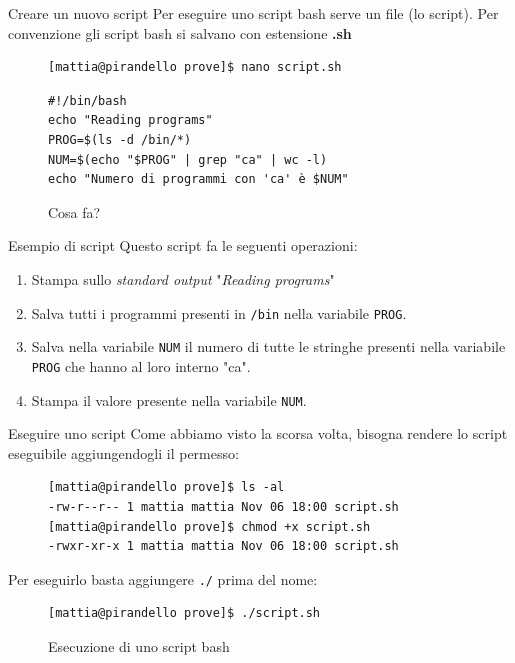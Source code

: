 \begin{frame}[fragile]{Creare un nuovo script}
  Per eseguire uno script bash serve un file (lo script). Per convenzione gli script bash si salvano con estensione \textbf{.sh}
  \medskip


  \begin{figure}
    \begin{lstlisting}
[mattia@pirandello prove]$ nano script.sh
\end{lstlisting}
  \end{figure}\medskip

  \begin{figure}
    \begin{lstlisting}[backgroundcolor=\color{expowhite!50!white}]
#!/bin/bash
echo "Reading programs"
PROG=$(ls -d /bin/*)
NUM=$(echo "$PROG" | grep "ca" | wc -l)
echo "Numero di programmi con 'ca' è $NUM"
\end{lstlisting}
    \caption{Cosa fa?}
  \end{figure}
\end{frame}


\begin{frame}[fragile]{Esempio di script}
  Questo script fa le seguenti operazioni:
  \begin{enumerate}
    \item Stampa sullo \textit{standard output} "\textit{Reading programs}"
    \item Salva tutti i programmi presenti in \texttt{/bin} nella variabile 
      \texttt{PROG}.
    \item Salva nella variabile \texttt{NUM} il numero di tutte le stringhe 
      presenti nella variabile \texttt{PROG} che hanno al loro interno "ca".
    \item Stampa il valore presente nella variabile \texttt{NUM}.
  \end{enumerate}
\end{frame}

\begin{frame}[fragile]{Eseguire uno script}
  Come abbiamo visto la scorsa volta, bisogna rendere lo script eseguibile aggiungendogli il permesso: 
  \begin{figure}
    \begin{lstlisting}
[mattia@pirandello prove]$ ls -al
-rw-r--r-- 1 mattia mattia Nov 06 18:00 script.sh
[mattia@pirandello prove]$ chmod +x script.sh
-rwxr-xr-x 1 mattia mattia Nov 06 18:00 script.sh
\end{lstlisting}
  \end{figure}

  Per eseguirlo basta aggiungere \texttt{./} prima del nome:
  \begin{figure}
    \begin{lstlisting}
[mattia@pirandello prove]$ ./script.sh
\end{lstlisting}
    \caption{Esecuzione di uno script bash}
  \end{figure}
\end{frame}

